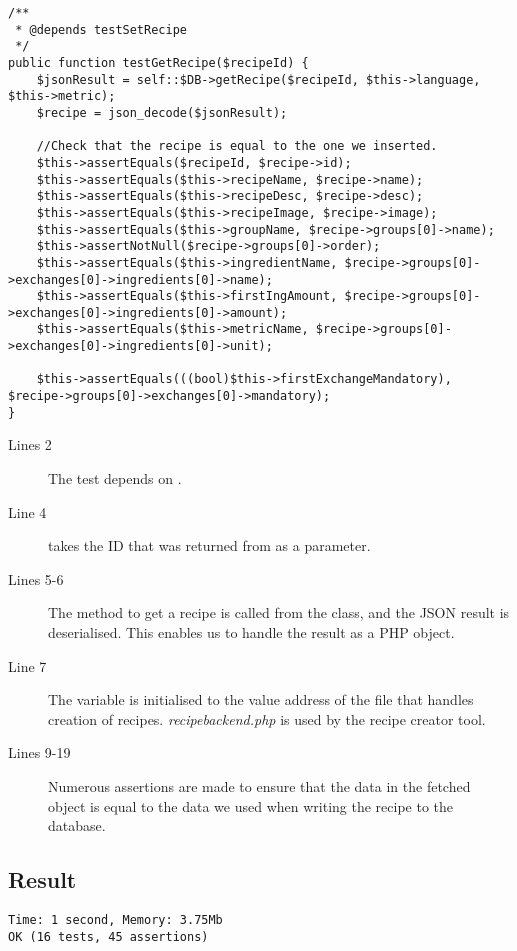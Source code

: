 \begin{lstlisting}[language=phpstyle]
/**
 * @depends testSetRecipe
 */
public function testGetRecipe($recipeId) {
    $jsonResult = self::$DB->getRecipe($recipeId, $this->language, $this->metric);
    $recipe = json_decode($jsonResult);

    //Check that the recipe is equal to the one we inserted.
    $this->assertEquals($recipeId, $recipe->id);
    $this->assertEquals($this->recipeName, $recipe->name);
    $this->assertEquals($this->recipeDesc, $recipe->desc);
    $this->assertEquals($this->recipeImage, $recipe->image);
    $this->assertEquals($this->groupName, $recipe->groups[0]->name);
    $this->assertNotNull($recipe->groups[0]->order);
    $this->assertEquals($this->ingredientName, $recipe->groups[0]->exchanges[0]->ingredients[0]->name);
    $this->assertEquals($this->firstIngAmount, $recipe->groups[0]->exchanges[0]->ingredients[0]->amount);
    $this->assertEquals($this->metricName, $recipe->groups[0]->exchanges[0]->ingredients[0]->unit);

    $this->assertEquals(((bool)$this->firstExchangeMandatory), $recipe->groups[0]->exchanges[0]->mandatory);
}
\end{lstlisting}%
\begin{description}
\item[Lines 2] The test depends on .
\item[Line 4]  takes the ID that was returned from  as a parameter.
\item[Lines 5-6] The method to get a recipe is called from the  class, and the JSON result is deserialised. This enables us to handle the result as a PHP object.
\item[Line 7] The  variable is initialised to the value address of the file that handles creation of recipes. \textit{recipebackend.php} is used by the recipe creator tool.%
\item[Lines 9-19] Numerous assertions are made to ensure that the data in the fetched object is equal to the data we used when writing the recipe to the database.
\end{description}

\subsection*{Result}
\begin{lstlisting}[numbers=none, basicstyle=\ttfamily, caption={The result of the PHPUnit test.}]
Time: 1 second, Memory: 3.75Mb
OK (16 tests, 45 assertions)
\end{lstlisting}

